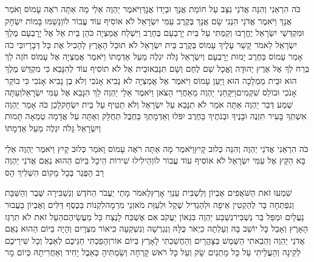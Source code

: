 \documentclass[../main/main.tex]{subfiles}
\begin{document}
\begin{multicols}{\ncols}
כֹּה הִרְאַנִי וְהִנֵּה אֲדֹנַי נִצָּב עַל חוֹמַת אֲנָךְ וּבְיָדוֹ אֲנָךְ\PreVerseSpace{}וַיֹּאמֶר יַהְוֶה אֵלַי מָה אַתָּה רֹאֶה עָמוֹס וָאֹמַר אֲנָךְ וַיֹּאמֶר אֲדֹנַי הִנְנִי שָׂם אֲנָךְ בְּקֶרֶב עַמִּי יִשְׂרָאֵל לֹא אוֹסִיף עוֹד עֲבוֹר לוֹ\PreVerseSpace{}וְנָשַׁמּוּ בָּמוֹת יִשְׂחָק וּמִקְדְּשֵׁי יִשְׂרָאֵל יֶחֱרָבוּ וְקַמְתִּי עַל בֵּית יָרָבְעָם בֶּחָרֶב \ClosedSection{}וַיִּשְׁלַח אֲמַצְיָה כֹּהֵן בֵּית אֵל אֶל יָרָבְעָם מֶלֶךְ יִשְׂרָאֵל לֵאמֹר קָשַׁר עָלֶיךָ עָמוֹס בְּקֶרֶב בֵּית יִשְׂרָאֵל לֹא תוּכַל הָאָרֶץ לְהָכִיל אֶת כָּל דְּבָרָיו\PreVerseSpace{}כִּי כֹה אָמַר עָמוֹס בַּחֶרֶב יָמוּת יָרָבְעָם וְיִשְׂרָאֵל גָּלֹה יִגְלֶה מֵעַל אַדְמָתוֹ \ClosedSection{}וַיֹּאמֶר אֲמַצְיָה אֶל עָמוֹס חֹזֶה לֵךְ בְּרַח לְךָ אֶל אֶרֶץ יְהוּדָה וֶאֱכָל שָׁם לֶחֶם וְשָׁם תִּנָּבֵא\PreVerseSpace{}וּבֵית אֵל לֹא תוֹסִיף עוֹד לְהִנָּבֵא כִּי מִקְדַּשׁ מֶלֶךְ הוּא וּבֵית מַמְלָכָה הוּא \ClosedSection{}וַיַּעַן עָמוֹס וַיֹּאמֶר אֶל אֲמַצְיָה לֹא נָבִיא אָנֹכִי וְלֹא בֶן נָבִיא אָנֹכִי כִּי בוֹקֵר אָנֹכִי וּבוֹלֵס שִׁקְמִים\PreVerseSpace{}וַיִּקָּחֵנִי יַהְוֶה מֵאַחֲרֵי הַצֹּאן וַיֹּאמֶר אֵלַי יַהְוֶה לֵךְ הִנָּבֵא אֶל עַמִּי יִשְׂרָאֵל\PreVerseSpace{}וְעַתָּה שְׁמַע דְּבַר יַהְוֶה אַתָּה אֹמֵר לֹא תִנָּבֵא עַל יִשְׂרָאֵל וְלֹא תַטִּיף עַל בֵּית יִשְׂחָק\PreVerseSpace{}לָכֵן כֹּה אָמַר יַהְוֶה אִשְׁתְּךָ בָּעִיר תִּזְנֶה וּבָנֶיךָ וּבְנֹתֶיךָ בַּחֶרֶב יִפֹּלוּ וְאַדְמָתְךָ בַּחֶבֶל תְּחֻלָּק וְאַתָּה עַל אֲדָמָה טְמֵאָה תָּמוּת וְיִשְׂרָאֵל גָּלֹה יִגְלֶה מֵעַל אַדְמָתוֹ\OpenSection{}\par
\pagebreak %
כֹּה הִרְאַנִי אֲדֹנַי יַהְוֶה וְהִנֵּה כְּלוּב קָיִץ\PreVerseSpace{}וַיֹּאמֶר מָה אַתָּה רֹאֶה עָמוֹס וָאֹמַר כְּלוּב קָיִץ וַיֹּאמֶר יַהְוֶה אֵלַי בָּא הַקֵּץ אֶל עַמִּי יִשְׂרָאֵל לֹא אוֹסִיף עוֹד עֲבוֹר לוֹ\PreVerseSpace{}וְהֵילִילוּ שִׁירוֹת הֵיכָל בַּיּוֹם הַהוּא נְאֻם אֲדֹנַי יַהְוֶה רַב הַפֶּגֶר בְּכָל מָקוֹם הִשְׁלִיךְ הָס\OpenSection{}\par
{}שִׁמְעוּ זֹאת הַשֹּׁאֲפִים אֶבְיוֹן וְלַשְׁבִּית עַנְוֵי אָרֶץ\PreVerseSpace{}לֵאמֹר מָתַי יַעֲבֹר הַחֹדֶשׁ וְנַשְׁבִּירָה שֶּׁבֶר וְהַשַּׁבָּת וְנִפְתְּחָה בָּר לְהַקְטִין אֵיפָה וּלְהַגְדִּיל שֶׁקֶל וּלְעַוֵּת מֹאזְנֵי מִרְמָה\PreVerseSpace{}לִקְנוֹת בַּכֶּסֶף דַּלִּים וְאֶבְיוֹן בַּעֲבוּר נַעֲלָיִם וּמַפַּל בַּר נַשְׁבִּיר\PreVerseSpace{}נִשְׁבַּע יַהְוֶה בִּגְאוֹן יַעֲקֹב אִם אֶשְׁכַּח לָנֶצַח כָּל מַעֲשֵׂיהֶם\PreVerseSpace{}הַעַל זֹאת לֹא תִרְגַּז הָאָרֶץ וְאָבַל כָּל יוֹשֵׁב בָּהּ וְעָלְתָה כַיְאֹר\SubEnd{} כֻּלָּהּ וְנִגְרְשָׁה וְנִשְׁקְעָה\SubEnd{} כִּיאוֹר מִצְרָיִם \ClosedSection{}וְהָיָה בַּיּוֹם הַהוּא נְאֻם אֲדֹנַי יַהְוֶה וְהֵבֵאתִי הַשֶּׁמֶשׁ בַּצָּהֳרָיִם וְהַחֲשַׁכְתִּי לָאָרֶץ בְּיוֹם אוֹר\PreVerseSpace{}וְהָפַכְתִּי חַגֵּיכֶם לְאֵבֶל וְכָל שִׁירֵיכֶם לְקִינָה וְהַעֲלֵיתִי עַל כָּל מָתְנַיִם שָׂק וְעַל כָּל רֹאשׁ קָרְחָה וְשַׂמְתִּיהָ כְּאֵבֶל יָחִיד וְאַחֲרִיתָהּ כְּיוֹם מָר\OpenSection{}\par

\end{multicols}
\end{document}
